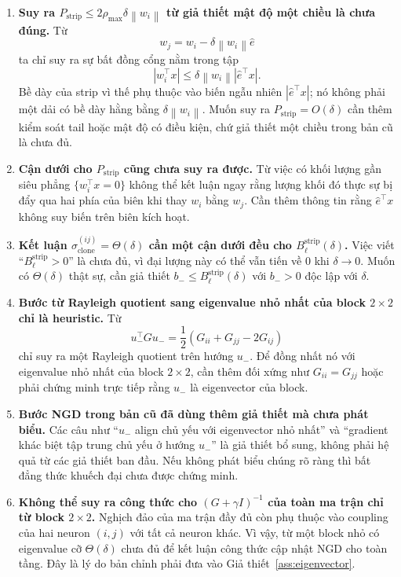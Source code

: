 \documentclass[11pt,a4paper]{article}
\newcommand{\norm}[1]{\left\lVert #1 \right\rVert}
\newcommand{\abs}[1]{\left\lvert #1 \right\rvert}
\begin{document}
\begin{enumerate}[label=\arabic*.]
    \item \textbf{Suy ra $P_{\mathrm{strip}} \le 2\rho_{\max}\delta\norm{w_i}$ từ giả thiết mật độ một chiều là chưa đúng.}
    Từ
    \[
    w_j = w_i - \delta\norm{w_i}\hat e
    \]
    ta chỉ suy ra sự bất đồng cổng nằm trong tập
    \[
    \abs{w_i^\top x} \le \delta\norm{w_i}\abs{\hat e^\top x}.
    \]
    Bề dày của strip vì thế phụ thuộc vào biến ngẫu nhiên $\abs{\hat e^\top x}$; nó
    không phải một dải có bề dày hằng bằng $\delta\norm{w_i}$. Muốn suy ra
    $P_{\mathrm{strip}} = O(\delta)$ cần thêm kiểm soát tail hoặc mật độ có điều kiện,
    chứ giả thiết một chiều trong bản cũ là chưa đủ.

    \item \textbf{Cận dưới cho $P_{\mathrm{strip}}$ cũng chưa suy ra được.}
    Từ việc có khối lượng gần siêu phẳng $\{w_i^\top x = 0\}$ không thể kết luận ngay
    rằng lượng khối đó thực sự bị đẩy qua hai phía của biên khi thay $w_i$ bằng $w_j$.
    Cần thêm thông tin rằng $\hat e^\top x$ không suy biến trên biên kích hoạt.

    \item \textbf{Kết luận $\sigma_{\mathrm{clone}}^{(ij)} = \Theta(\delta)$ cần một cận dưới đều cho $B_\ell^{\mathrm{strip}}(\delta)$.}
    Việc viết ``$B_\ell^{\mathrm{strip}} > 0$'' là chưa đủ, vì đại lượng này có thể vẫn
    tiến về $0$ khi $\delta \to 0$. Muốn có $\Theta(\delta)$ thật sự, cần giả thiết
    $b_- \le B_\ell^{\mathrm{strip}}(\delta)$ với $b_->0$ độc lập với $\delta$.

    \item \textbf{Bước từ Rayleigh quotient sang eigenvalue nhỏ nhất của block $2\times 2$ chỉ là heuristic.}
    Từ
    \[
    u_-^\top G u_- = \frac{1}{2}(G_{ii}+G_{jj}-2G_{ij})
    \]
    chỉ suy ra một Rayleigh quotient trên hướng $u_-$. Để đồng nhất nó với
    eigenvalue nhỏ nhất của block $2\times 2$, cần thêm đối xứng như
    $G_{ii}=G_{jj}$ hoặc phải chứng minh trực tiếp rằng $u_-$ là eigenvector của block.

    \item \textbf{Bước NGD trong bản cũ đã dùng thêm giả thiết mà chưa phát biểu.}
    Các câu như ``$u_-$ align chủ yếu với eigenvector nhỏ nhất'' và ``gradient khác biệt
    tập trung chủ yếu ở hướng $u_-$'' là giả thiết bổ sung, không phải hệ quả từ các giả
    thiết ban đầu. Nếu không phát biểu chúng rõ ràng thì bất đẳng thức khuếch đại chưa
    được chứng minh.

    \item \textbf{Không thể suy ra công thức cho $(G+\gamma I)^{-1}$ của toàn ma trận chỉ từ block $2\times 2$.}
    Nghịch đảo của ma trận đầy đủ còn phụ thuộc vào coupling của hai neuron $(i,j)$ với
    tất cả neuron khác. Vì vậy, từ một block nhỏ có eigenvalue cỡ $\Theta(\delta)$ chưa
    đủ để kết luận công thức cập nhật NGD cho toàn tầng. Đây là lý do bản chỉnh phải đưa
    vào Giả thiết~\ref{ass:eigenvector}.
\end{enumerate}
\end{document}
